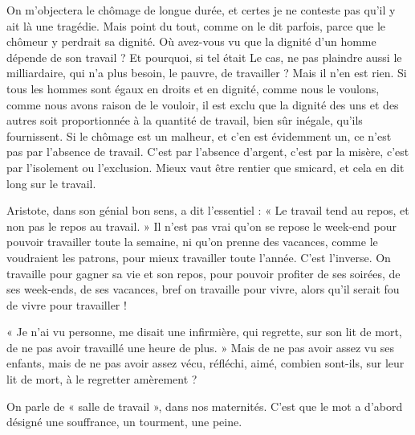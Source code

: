 On m'objectera le chômage de longue durée, et certes je ne conteste pas
qu'il y ait là une tragédie. Mais point du tout, comme on le dit parfois, parce
que le chômeur y perdrait sa dignité. Où avez-vous vu que la dignité d’un
homme dépende de son travail ? Et pourquoi, si tel était Le cas, ne pas plaindre
aussi le milliardaire, qui n’a plus besoin, le pauvre, de travailler ? Mais il n’en
est rien. Si tous les hommes sont égaux en droits et en dignité, comme nous le
voulons, comme nous avons raison de le vouloir, il est exclu que la dignité des
uns et des autres soit proportionnée à la quantité de travail, bien sûr inégale,
qu’ils fournissent. Si le chômage est un malheur, et c’en est évidemment un, ce
n'est pas par l'absence de travail. C’est par l’absence d’argent, c’est par la
misère, c’est par l'isolement ou l'exclusion. Mieux vaut être rentier que smicard,
et cela en dit long sur le travail.

Aristote, dans son génial bon sens, a dit l’essentiel : « Le travail tend au
repos, et non pas le repos au travail. » Il n’est pas vrai qu’on se repose le week-end
pour pouvoir travailler toute la semaine, ni qu’on prenne des vacances,
comme le voudraient les patrons, pour mieux travailler toute l’année. C’est
l'inverse. On travaille pour gagner sa vie et son repos, pour pouvoir profiter de
ses soirées, de ses week-ends, de ses vacances, bref on travaille pour vivre, alors
qu’il serait fou de vivre pour travailler !

« Je n’ai vu personne, me disait une infirmière, qui regrette, sur son lit de
mort, de ne pas avoir travaillé une heure de plus. » Mais de ne pas avoir assez
vu ses enfants, mais de ne pas avoir assez vécu, réfléchi, aimé, combien sont-ils,
sur leur lit de mort, à le regretter amèrement ?

On parle de « salle de travail », dans nos maternités. C’est que le mot a
d’abord désigné une souffrance, un tourment, une peine.

